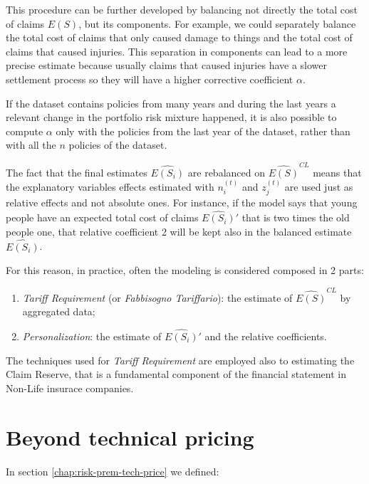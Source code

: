 \documentclass[a4paper, twoside, openright, 12pt]{report}
\providecommand{\tightlist}{%
  \setlength{\itemsep}{0pt}\setlength{\parskip}{0pt}}
\theoremstyle{definition}
\theoremstyle{definition}
\theoremstyle{definition}
\theoremstyle{remark}
\begin{document}
This procedure can be further developed by balancing not directly the total cost of claims \(E(S)\), but its components. For example, we could separately balance the total cost of claims that only caused damage to things and the total cost of claims that caused injuries. This separation in components can lead to a more precise estimate because usually claims that caused injuries have a slower settlement process so they will have a higher corrective coefficient \(\alpha\).

If the dataset contains policies from many years and during the last years a relevant change in the portfolio risk mixture happened, it is also possible to compute \(\alpha\) only with the policies from the last year of the dataset, rather than with all the \(n\) policies of the dataset.

The fact that the final estimates \(\widehat{E(S_i)}\) are rebalanced on \(\widehat{E(S)}^{CL}\) means that the explanatory variables effects estimated with \(n_i^{(t)}\) and \(z_j^{(t)}\) are used just as relative effects and not absolute ones. For instance, if the model says that young people have an expected total cost of claims \(\widehat{E(S_i)}'\) that is two times the old people one, that relative coefficient 2 will be kept also in the balanced estimate \(\widehat{E(S_i)}\).

For this reason, in practice, often the modeling is considered composed in 2 parts:

\begin{enumerate}
\def\labelenumi{\arabic{enumi}.}
\tightlist
\item
  \emph{Tariff Requirement} (or \emph{Fabbisogno Tariffario}): the estimate of \(\widehat{E(S)}^{CL}\) by aggregated data;
\item
  \emph{Personalization}: the estimate of \(\widehat{E(S_i)}'\) and the relative coefficients.
\end{enumerate}

The techniques used for \emph{Tariff Requirement} are employed also to estimating the Claim Reserve, that is a fundamental component of the financial statement in Non-Life insurace companies.

\hypertarget{beyond-technical-pricing}{%
\section{Beyond technical pricing}\label{beyond-technical-pricing}}

In section \ref{chap:risk-prem-tech-price} we defined:
\end{document}
